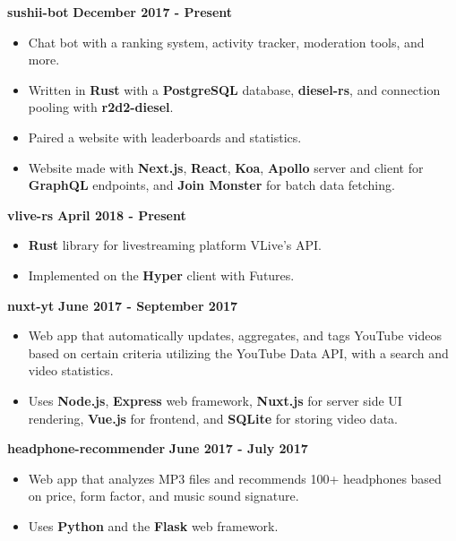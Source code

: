 \documentclass{res}
\begin{document}
\begin{resume}
		{\bf sushii-bot} \hfill {\bf December 2017 - Present} \\
			\vspace{-3.5mm}
			\begin{itemize} \itemsep -2pt
				\item Chat bot with a ranking system, activity tracker, moderation tools, and more. 
				\item Written in {\bf Rust} with a {\bf PostgreSQL} database, {\bf diesel-rs}, and connection pooling with {\bf r2d2-diesel}.
				\item Paired a website with leaderboards and statistics.
				\item Website made with {\bf Next.js}, {\bf React}, {\bf Koa}, {\bf Apollo} server and client for {\bf GraphQL} endpoints,
					and {\bf Join Monster} for batch data fetching.
			\end{itemize}
		
		{\bf vlive-rs} \hfill {\bf April 2018 - Present} \\
			\vspace{-3.5mm}
			\begin{itemize} \itemsep -2pt
				\item {\bf Rust} library for livestreaming platform VLive's API.
				\item Implemented on the {\bf Hyper} client with Futures.
			\end{itemize}

		{\bf nuxt-yt} \hfill {\bf June 2017 - September 2017} \\
			\vspace{-3.5mm}
			\begin{itemize} \itemsep -2pt
				\item Web app that automatically updates, aggregates, and tags YouTube videos based on certain criteria utilizing the YouTube Data API,
					with a search and video statistics.
				\item Uses {\bf Node.js}, {\bf Express} web framework, {\bf Nuxt.js} for server side 
					UI rendering, {\bf Vue.js} for frontend, and {\bf SQLite} for storing video data.
			\end{itemize}

		{\bf headphone-recommender} \hfill {\bf June 2017 - July 2017} \\
			\vspace{-3.5mm}
			\begin{itemize}	\itemsep -2pt
				\item Web app that analyzes MP3 files and recommends 100+ headphones based on price, form factor, and music sound signature.
				\item Uses {\bf Python} and the {\bf Flask} web framework.
			\end{itemize}
		

\end{resume}
\end{document}
